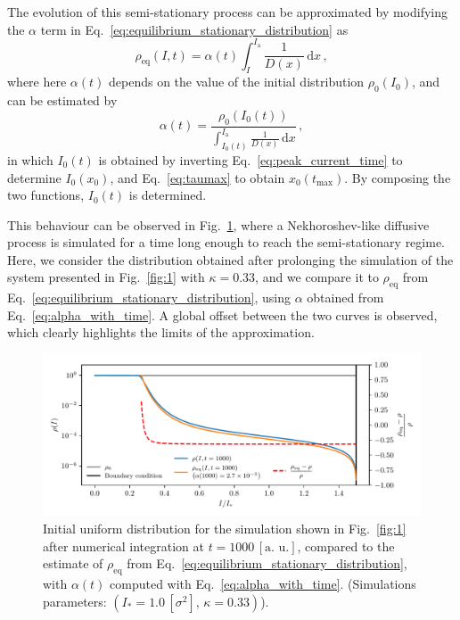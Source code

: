 The evolution of this semi-stationary process can be approximated by modifying the $\alpha$ term in Eq.~\eqref{eq:equilibrium_stationary_distribution} as
\begin{equation}
    \rho_\mathrm{eq}(I, t) = \alpha(t) \int_I^{I_\mathrm{a}} \frac{1}{D(x)}\,\mathrm{d}x\,,
    \label{eq:semi_stationary_distribution}
\end{equation}
where here $\alpha(t)$ depends on the value of the initial distribution $\rho_0(I_0)$, and can be estimated by
\begin{equation}
    \alpha(t) = \frac{\rho_0\left(I_0(t)\right)}{\displaystyle{ \int_{I_0(t)}^{I_\mathrm{a}} \frac{1}{D(x)}\,\mathrm{d}x}}\,,
    \label{eq:alpha_with_time}
\end{equation}
in which $I_0(t)$ is obtained by inverting Eq.~\eqref{eq:peak_current_time} to determine $I_0(x_0)$, and Eq.~\eqref{eq:taumax} to obtain $x_0(t_\mathrm{max})$. By composing the two functions, $I_0(t)$ is determined.

This behaviour can be observed in Fig.~\ref{fig:3}, where a Nekhoroshev-like diffusive process is simulated for a time long enough to reach the semi-stationary regime. Here, we consider the distribution obtained after prolonging the simulation of the system presented in Fig.~\ref{fig:1} with $\kappa=0.33$, and we compare it to $\rho_\mathrm{eq}$ from Eq.~\eqref{eq:equilibrium_stationary_distribution}, using $\alpha$ obtained from Eq.~\eqref{eq:alpha_with_time}. A global offset between the two curves is observed, which clearly highlights the limits of the approximation. 

\begin{figure}[htp]
    \centering
    \includegraphics[width=\textwidth]{4_probing_the_diffusive_behavior/figs/final/new_stationary_distribution_s.pdf}
    \caption{Initial uniform distribution for the simulation shown in Fig.~\ref{fig:1} after numerical integration at $t=1000 \, [\text{a. u.}]$, compared to the estimate of $\rho_\mathrm{eq}$ from Eq.~\eqref{eq:equilibrium_stationary_distribution}, with $\alpha(t)$ computed with Eq.~\eqref{eq:alpha_with_time}. (Simulations parameters: $(I_\ast = 1.0\,[\sigma^2],\, \kappa = 0.33)$).}
    \label{fig:3}
\end{figure}

